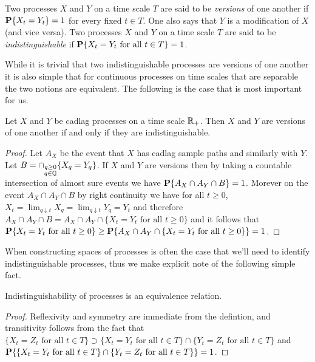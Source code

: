 \begin{defn}Two processes $X$ and $Y$ on a time scale $T$ are said to be \emph{versions} of one another if $\textbf{P}\{X_t = Y_t\} = 1$ for every fixed $t \in T$.   One also says that $Y$ is a modification of $X$ (and vice versa).  Two processes $X$ and $Y$ on a time scale $T$ are said to be \emph{indistinguishable} if $\textbf{P}\{X_t = Y_t \text{ for all } t \in T\} = 1$.
\end{defn}

While it is trivial that two indistinguishable processes are versions of one another it is also simple that for continuous processes on time scales that are separable the two notions are equivalent.  The following is the case that is most important for us.
\begin{prop}Let $X$ and $Y$ be cadlag processes on a time scale $\mathbb{R}_+$.  Then $X$ and $Y$ are versions of one another if and only if they are indistinguishable.
\end{prop}
\begin{proof}
Let $A_X$ be the event that $X$ has cadlag sample paths and similarly with $Y$.  Let $B = \cap_{\substack{ q \geq 0 \\ q \in \mathbb{Q}}} \lbrace X_q = Y_q\rbrace$.  If $X$ and $Y$ are versions then by taking a countable intersection of almost sure events we have $\textbf{P}\{A_X \cap A_Y \cap B\} = 1$.  Morever on the event $A_X \cap A_Y \cap B$ by right continuity we have for all $t \geq 0$, $X_t = \lim_{q \downarrow t} X_q = \lim_{q \downarrow t} Y_q = Y_t$ and therefore $A_X \cap A_Y \cap B = A_X \cap A_Y \cap \lbrace X_t = Y_t \text { for all } t\geq 0\rbrace$ and it follows that $\textbf{P}\{X_t = Y_t \text { for all } t\geq 0\} \geq \textbf{P}\{A_X \cap A_Y \cap \lbrace X_t = Y_t \text { for all } t\geq 0\rbrace\} = 1$.
\end{proof}

When constructing spaces of processes is often the case that we'll need to identify indistinguishable processes, thus we make explicit note of the following simple fact.
\begin{prop}Indistinguishability of processes is an equivalence relation.
\end{prop}
\begin{proof}
Reflexivity and symmetry are immediate from the defintion, and transitivity follows from the fact that $\lbrace X_t = Z_t \text{ for all } t \in T \rbrace \supset \lbrace X_t = Y_t \text{ for all } t \in T \rbrace \cap \lbrace Y_t = Z_t \text{ for all } t \in T\rbrace$ and $\textbf{P}\{\lbrace X_t = Y_t \text{ for all } t \in T \rbrace \cap \lbrace Y_t = Z_t \text{ for all } t \in T\rbrace\} = 1$.
\end{proof}

